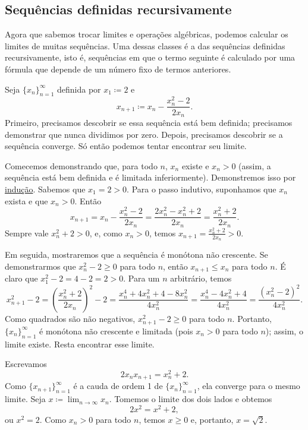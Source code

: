 \subsection{Sequências definidas recursivamente}

Agora que sabemos trocar limites e operações algébricas, podemos
calcular os limites de muitas sequências.
Uma dessas classes é a das sequências definidas recursivamente, isto é, sequências em que
o termo seguinte é calculado por uma fórmula que depende de um número fixo
de termos anteriores.

\begin{example}
Seja $\{ x_n \}_{n=1}^\infty$ definida por $x_1 \coloneqq 2$ e
\begin{equation*}
x_{n+1} \coloneqq x_n - \frac{x_n^2-2}{2x_n} .
\end{equation*}
Primeiro, precisamos descobrir se essa sequência está bem definida; precisamos demonstrar que nunca
dividimos por zero.
Depois, precisamos descobrir se a sequência converge. Só então
podemos tentar encontrar seu limite.

Comecemos demonstrando que, para todo $n$,
$x_n$ existe e $x_n > 0$
(assim, a sequência está bem definida e é limitada inferiormente).
Demonstremos isso por \hyperref[induction:thm]{indução}. Sabemos que
$x_1 = 2 > 0$. Para o passo indutivo, suponhamos que $x_n$ exista e
que $x_n > 0$. Então
\begin{equation*}
x_{n+1} = x_n - \frac{x_n^2-2}{2x_n} =
\frac{2x_n^2 - x_n^2+2}{2x_n} =
\frac{x_n^2+2}{2x_n} .
\end{equation*}
Sempre vale $x_n^2+2 > 0$,
e, como
$x_n > 0$, temos $x_{n+1} = \frac{x_n^2+2}{2x_n} > 0$.

Em seguida, mostraremos que a sequência é monótona não crescente. Se demonstrarmos que
$x_n^2-2 \geq 0$ para todo $n$, então $x_{n+1} \leq x_n$ para todo $n$.
É claro que $x_1^2-2 = 4-2 = 2 > 0$. Para um $n$ arbitrário, temos
\begin{equation*}
x_{n+1}^2-2 =
{\left( \frac{x_n^2+2}{2x_n} \right)}^2 - 2
=
\frac{x_n^4+4x_n^2+4 - 8x_n^2}{4x_n^2}
=
\frac{x_n^4-4x_n^2+4}{4x_n^2}
=
\frac{{\left( x_n^2-2 \right)}^2}{4x_n^2} .
\end{equation*}
Como quadrados são não negativos,
$x_{n+1}^2-2 \geq 0$ para todo $n$. Portanto,
$\{ x_n \}_{n=1}^\infty$ é monótona não crescente e limitada (pois $x_n > 0$ para todo $n$); assim,
o limite existe. Resta encontrar esse limite.

Escrevamos
\begin{equation*}
2x_nx_{n+1} = x_n^2+2 .
\end{equation*}
Como $\{ x_{n+1} \}_{n=1}^\infty$ é a cauda de ordem 1 de $\{ x_n \}_{n=1}^\infty$, ela converge para o
mesmo limite. Seja $x \coloneqq \lim_{n\to\infty} x_n$. Tomemos o limite dos
dois lados e obtemos
\begin{equation*}
2x^2 = x^2+2 ,
\end{equation*}
ou $x^2 = 2$. Como $x_n > 0$ para todo $n$, temos $x \geq 0$ e, portanto, $x = \sqrt{2}$.
\end{example}

